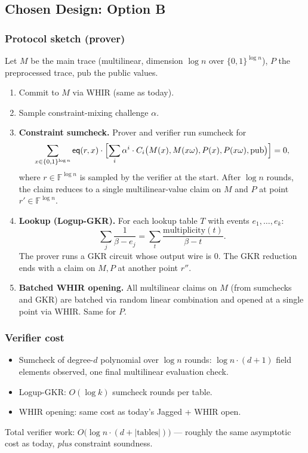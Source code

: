 \subsection{Chosen Design: Option B}

\subsubsection*{Protocol sketch (prover)}

Let $M$ be the main trace (multilinear, dimension $\log n$ over
$\{0,1\}^{\log n}$), $P$ the preprocessed trace, $\mathrm{pub}$ the public
values.

\begin{enumerate}[label=\textbf{Round \arabic*.}, wide=0pt]
  \item Commit to $M$ via WHIR (same as today).
  \item Sample constraint-mixing challenge $\alpha$.
  \item \textbf{Constraint sumcheck.} Prover and verifier run sumcheck for
        $$
          \sum_{x \in \{0,1\}^{\log n}} \mathsf{eq}(r, x) \cdot \Bigl[ \sum_i \alpha^i \cdot C_i\bigl(M(x), M(x \omega), P(x), P(x \omega), \mathrm{pub}\bigr) \Bigr] = 0,
        $$
        where $r \in \mathbb{F}^{\log n}$ is sampled by the verifier at the
        start. After $\log n$ rounds, the claim reduces to a single
        multilinear-value claim on $M$ and $P$ at point $r' \in \mathbb{F}^{\log n}$.
  \item \textbf{Lookup (Logup-GKR).} For each lookup table $T$ with events
        $e_1, \dots, e_k$:
        $$
          \sum_j \frac{1}{\beta - e_j} = \sum_t \frac{\text{multiplicity}(t)}{\beta - t}.
        $$
        The prover runs a GKR circuit whose output wire is $0$. The GKR
        reduction ends with a claim on $M, P$ at another point $r''$.
  \item \textbf{Batched WHIR opening.} All multilinear claims on $M$ (from
        sumchecks and GKR) are batched via random linear combination and
        opened at a single point via WHIR. Same for $P$.
\end{enumerate}

\subsubsection*{Verifier cost}

\begin{itemize}
  \item Sumcheck of degree-$d$ polynomial over $\log n$ rounds:
        $\log n \cdot (d+1)$ field elements observed, one final multilinear
        evaluation check.
  \item Logup-GKR: $O(\log k)$ sumcheck rounds per table.
  \item WHIR opening: same cost as today's Jagged + WHIR open.
\end{itemize}
Total verifier work: $O\bigl(\log n \cdot (d + |\text{tables}|)\bigr)$ ---
roughly the same asymptotic cost as today, \emph{plus} constraint
soundness.

